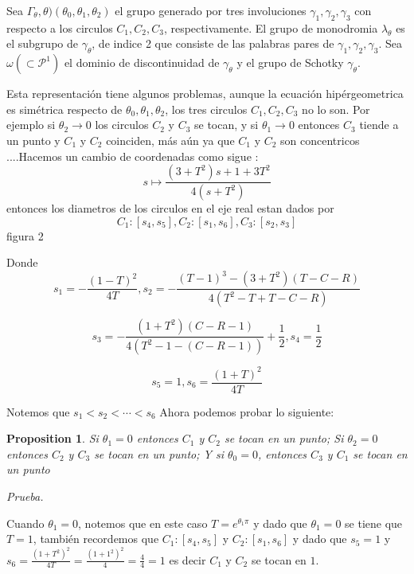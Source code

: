 \documentclass[11pt]{report}
\newtheorem{prop}[thm]{Proposition}
\theoremstyle{definition}
\theoremstyle{remark}
\begin{document}
Sea $\Gamma _{\theta}, \theta ) (\theta_{0},\theta_{1},\theta_{2})$ el grupo generado por tres involuciones $\gamma_{1},\gamma_{2},\gamma_{3}$ con respecto a los circulos $C_{1},C_{2},C_{3}$, respectivamente.
El grupo de monodromia $\lambda_{\theta }$ es el subgrupo de $\gamma_{\theta}$, de indice 2 que consiste de las palabras pares de $\gamma_{1},\gamma_{2},\gamma_{3}$. Sea $\omega ( \subset \mathcal{P^{1}})$ el dominio de discontinuidad de $\gamma_{\theta}$ y el grupo de Schotky $\gamma_{\theta}$.

Esta representaci\'on tiene algunos problemas, aunque la ecuaci\'on hipérgeometrica es sim\'etrica respecto de $\theta_{0},\theta_{1},\theta_{2}$, los tres circulos $C_{1},C_{2},C_{3}$ no lo son. Por ejemplo si $\theta_{2} \rightarrow 0$ los circulos $C_{2}$ y $C_{3}$ se tocan, y si $\theta_{1} \rightarrow 0$ entonces $C_{3}$ tiende a un punto y $C_{1}$ y $C_{2}$ coinciden, m\'as a\'un ya que $C_{1}$  y $C_{2}$ son concentricos ....Hacemos un cambio de coordenadas como sigue : $$s \mapsto \frac{(3 + T^{2})s + 1 + 3T^{2}}{4(s + T^{2})} $$ entonces los diametros de los circulos en el eje real estan dados por  $$ C_{1}:[s_{4},s_{5}],C_{2}:[s_{1},s_{6}],C_{3}:[s_{2},s_{3}]$$ figura 2

Donde $$s_{1} = - \frac{(1-T)^{2}}{4T} , s_{2}= - \frac{(T-1)^{3} - (3 + T^{2})(T-C-R)}{4(T^{2} - T + T -C-R)}$$



$$s_{3}= -\frac{(1+T^{2})(C-R-1)}{4(T^{2}-1-(C-R-1))} + \frac{1}{2}, s_{4} = \frac{1}{2} $$

$$s_{5} = 1 , s_{6} = \frac{(1+ T)^{2}}{4T} $$


Notemos que $s_{1}< s_{2}< \cdots < s_{6}$ Ahora podemos probar lo siguiente:

\begin{prop} Si $\theta_{1} = 0$ entonces $C_{1}$  y $C_{2}$ se tocan en un punto; Si $\theta_{2} = 0 $ entonces $C_{2}$ y $C_{3}$ se tocan en un punto; Y si $\theta_{0} = 0$, entonces $C_{3}$ y $C_{1}$ se tocan en un punto  
\end{prop}

\textit{Prueba.}

Cuando $\theta_{1} = 0$, notemos que en este caso $T = e^{\theta_{1} \pi}$ y dado que $\theta_{1} = 0$ se tiene que $T =1$, tambi\'en recordemos que $C_{1}:[s_{4},s_{5}]$ y $C_{2}: [s_{1}, s_{6}]$ y dado que $s_{5} = 1 $ y $s_{6} = \frac{(1+ T^{2})^{2}}{4T} = \frac{(1 + 1^{2})^{2}}{4} = \frac{4}{4} = 1$ es decir $C_{1}$ y $C_{2}$ se tocan en $1$.
\end{document}
